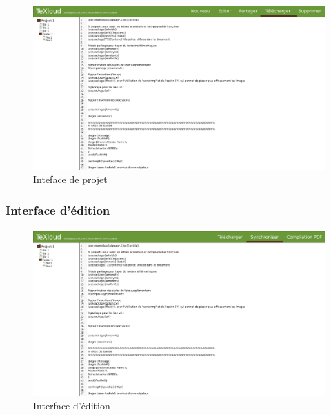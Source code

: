 \documentclass[a4paper,12pt]{article}
\begin{document}
\paragraph{}
\begin{figure}[!ht]
\begin{center}
  \includegraphics[width=1\textwidth, angle=90]{../layout/layout_texloud_project.png}
\end{center}
  \caption{Inteface de projet}
  \label{uiProject}
\end{figure}

\newpage
\subsubsection{Interface d'édition}
\paragraph{}
\begin{figure}[!ht]
\begin{center}
  \includegraphics[width=1\textwidth, angle=90]{../layout/layout_texloud_std.png}
\end{center}
  \caption{Interface d'édition}
  \label{uiEdit}
\end{figure}
\end{document}
